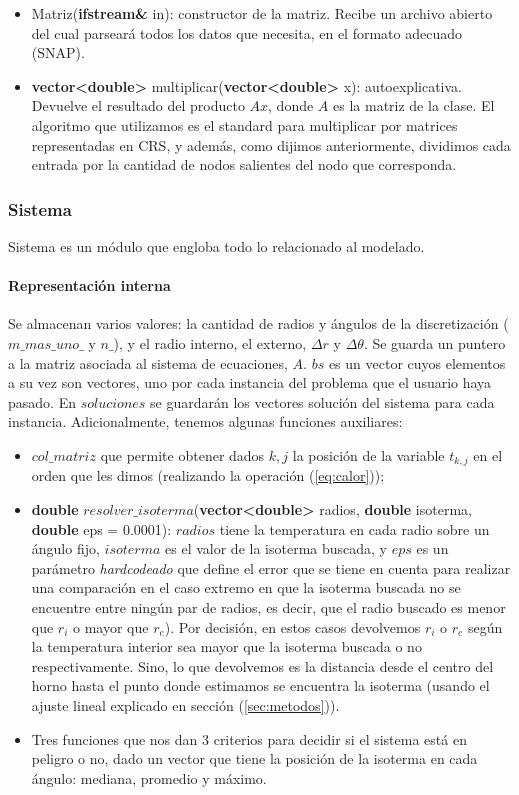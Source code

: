 \begin{itemize}
    \item Matriz(\textbf{ifstream\&} in): constructor de la matriz. Recibe un archivo abierto del cual parseará todos los datos que necesita, en el formato adecuado (SNAP).

    \item \textbf{vector<double>} multiplicar(\textbf{vector<double>} x): autoexplicativa. Devuelve el resultado del producto $Ax$, donde $A$ es la matriz de la clase. El algoritmo que utilizamos es el standard para multiplicar por matrices representadas en CRS, y además, como dijimos anteriormente, dividimos cada entrada por la cantidad de nodos salientes del nodo que corresponda.
\end{itemize}


\subsubsection{Sistema}
Sistema es un módulo que engloba todo lo relacionado al modelado.

\paragraph{Representación interna}
Se almacenan varios valores: la cantidad de radios y ángulos de la discretización ($m\_mas\_uno\_$ y $n\_$), y el radio interno, el externo, $\Delta r$ y $\Delta\theta$. Se guarda un puntero a la matriz asociada al sistema de ecuaciones, $A$. $bs$ es un vector cuyos elementos a su vez son vectores, uno por cada instancia del problema que el usuario haya pasado. En $soluciones$ se guardarán los vectores solución del sistema para cada instancia.
Adicionalmente, tenemos algunas funciones auxiliares: 

\begin{itemize}
    \item $col\_matriz$ que permite obtener dados $k,j$ la posición de la variable $t_{k,j}$ en el orden que les dimos (realizando la operación (\ref{eq:calor}));
    \item \textbf{double} $resolver\_isoterma$(\textbf{vector<double>} radios, \textbf{double} isoterma, \textbf{double} eps = 0.0001): $radios$ tiene la temperatura en cada radio sobre un ángulo fijo, $isoterma$ es el valor de la isoterma buscada, y $eps$ es un parámetro \textit{hardcodeado} que define el error que se tiene en cuenta para realizar una comparación en el caso extremo en que la isoterma buscada no se encuentre entre ningún par de radios, es decir, que el radio buscado es menor que $r_i$ o mayor que $r_e$). Por decisión, en estos casos devolvemos $r_i$ o $r_e$ según la temperatura interior sea mayor que la isoterma buscada o no respectivamente. Sino, lo que devolvemos es la distancia desde el centro del horno hasta el punto donde estimamos se encuentra la isoterma (usando el ajuste lineal explicado en sección (\ref{sec:metodos})).
    \item Tres funciones que nos dan 3 criterios para decidir si el sistema está en peligro o no, dado un vector que tiene la posición de la isoterma en cada ángulo: mediana, promedio y máximo. 
\end{itemize}


